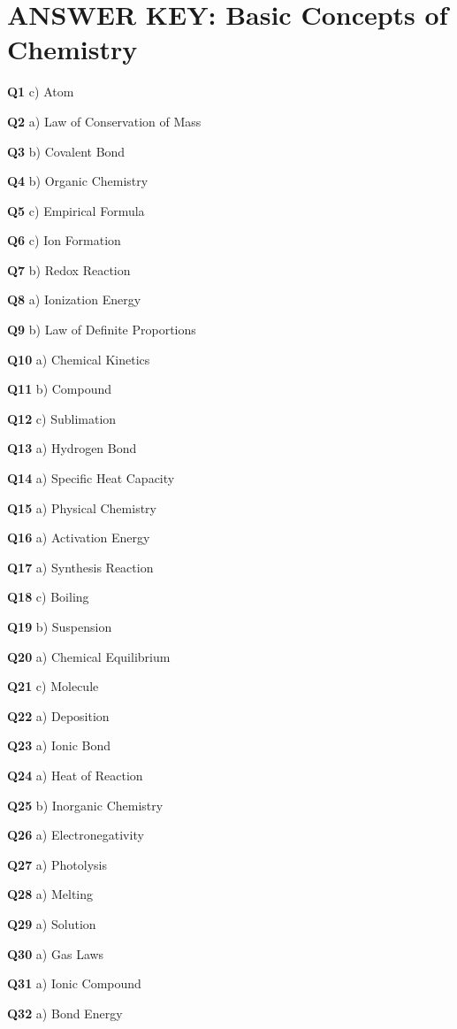 \section{ANSWER KEY: Basic Concepts of Chemistry}

\textbf{Q1} c) Atom\par
\textbf{Q2} a) Law of Conservation of Mass\par
\textbf{Q3} b) Covalent Bond\par
\textbf{Q4} b) Organic Chemistry\par
\textbf{Q5} c) Empirical Formula\par
\textbf{Q6} c) Ion Formation\par
\textbf{Q7} b) Redox Reaction\par
\textbf{Q8} a) Ionization Energy\par
\textbf{Q9} b) Law of Definite Proportions\par
\textbf{Q10} a) Chemical Kinetics\par
\textbf{Q11} b) Compound\par
\textbf{Q12} c) Sublimation\par
\textbf{Q13} a) Hydrogen Bond\par
\textbf{Q14} a) Specific Heat Capacity\par
\textbf{Q15} a) Physical Chemistry\par
\textbf{Q16} a) Activation Energy\par
\textbf{Q17} a) Synthesis Reaction\par
\textbf{Q18} c) Boiling\par
\textbf{Q19} b) Suspension\par
\textbf{Q20} a) Chemical Equilibrium\par
\textbf{Q21} c) Molecule\par
\textbf{Q22} a) Deposition\par
\textbf{Q23} a) Ionic Bond\par
\textbf{Q24} a) Heat of Reaction\par
\textbf{Q25} b) Inorganic Chemistry\par
\textbf{Q26} a) Electronegativity\par
\textbf{Q27} a) Photolysis\par
\textbf{Q28} a) Melting\par
\textbf{Q29} a) Solution\par
\textbf{Q30} a) Gas Laws\par
\textbf{Q31} a) Ionic Compound\par
\textbf{Q32} a) Bond Energy\par
